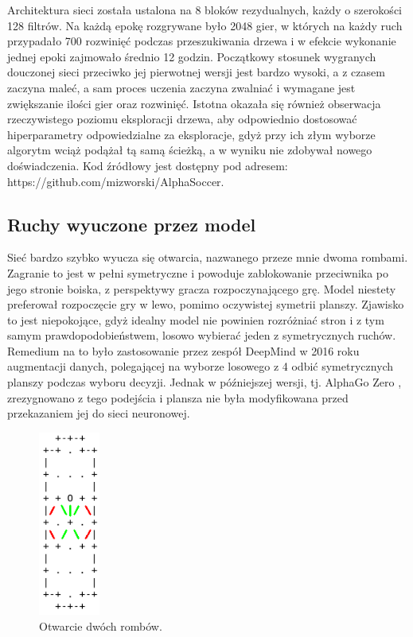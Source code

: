 \documentclass[licencjacka]{pracamgr}
\begin{document}
Architektura sieci została ustalona na 8 bloków rezydualnych, każdy o szerokości 128 filtrów. Na każdą epokę rozgrywane było 2048 gier, w których na każdy ruch przypadało 700 rozwinięć podczas przeszukiwania drzewa i w efekcie wykonanie jednej epoki zajmowało średnio 12 godzin. Początkowy stosunek wygranych douczonej sieci przeciwko jej pierwotnej wersji jest bardzo wysoki, a z czasem zaczyna maleć, a sam proces uczenia zaczyna zwalniać i wymagane jest zwiększanie ilości gier oraz rozwinięć. Istotna okazała się również obserwacja rzeczywistego poziomu eksploracji drzewa, aby odpowiednio dostosować hiperparametry odpowiedzialne za eksploracje, gdyż przy ich złym wyborze algorytm wciąż podążał tą samą ścieżką, a w wyniku nie zdobywał nowego doświadczenia. Kod źródłowy jest dostępny pod adresem: https://github.com/mizworski/AlphaSoccer.


\subsection{Ruchy wyuczone przez model}

Sieć bardzo szybko wyucza się otwarcia, nazwanego przeze mnie dwoma rombami. Zagranie to jest w pełni symetryczne i powoduje zablokowanie przeciwnika po jego stronie boiska, z perspektywy gracza rozpoczynającego grę. Model niestety preferował rozpoczęcie gry w lewo, pomimo oczywistej symetrii planszy. Zjawisko to jest niepokojące, gdyż idealny model nie powinien rozróżniać stron i z tym samym prawdopodobieństwem, losowo wybierać jeden z symetrycznych ruchów. Remedium na to było zastosowanie przez zespół DeepMind w 2016 \cite{alphago2016} roku augmentacji danych, polegającej na wyborze losowego z 4 odbić symetrycznych planszy podczas wyboru decyzji. Jednak w późniejszej wersji, tj. AlphaGo Zero \cite{alphagozero}, zrezygnowano z tego podejścia i plansza nie była modyfikowana przed przekazaniem jej do sieci neuronowej.


\begin{figure}[ht!]
  \centering
  \includegraphics[width=20mm]{romb}
  \caption{Otwarcie dwóch rombów.}
\end{figure}
\end{document}
